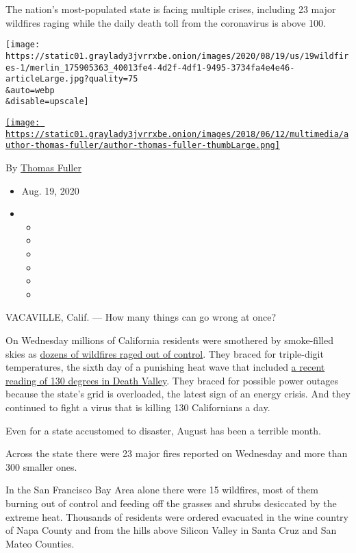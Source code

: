The nation's most-populated state is facing multiple crises, including
23 major wildfires raging while the daily death toll from the
coronavirus is above 100.

\texttt{[image: https://static01.graylady3jvrrxbe.onion/images/2020/08/19/us/19wildfires-1/merlin\_175905363\_40013fe4-4d2f-4df1-9495-3734fa4e4e46-articleLarge.jpg?quality=75\\\&auto=webp\\\&disable=upscale]}

\href{https://www.nytimes3xbfgragh.onion/by/thomas-fuller}{\texttt{[image: https://static01.graylady3jvrrxbe.onion/images/2018/06/12/multimedia/author-thomas-fuller/author-thomas-fuller-thumbLarge.png]}}

By \href{https://www.nytimes3xbfgragh.onion/by/thomas-fuller}{Thomas
Fuller}

\begin{itemize}
\item
  Aug. 19, 2020
\item
  \begin{itemize}
  \item
  \item
  \item
  \item
  \item
  \item
  \end{itemize}
\end{itemize}

VACAVILLE, Calif. --- How many things can go wrong at once?

On Wednesday millions of California residents were smothered by
smoke-filled skies as
\href{https://www.nytimes3xbfgragh.onion/2020/08/20/us/northern-california-wildfires.html}{dozens
of wildfires raged out of control}. They braced for triple-digit
temperatures, the sixth day of a punishing heat wave that included
\href{https://www.nytimes3xbfgragh.onion/2020/08/17/climate/death-valley-hottest-temperature-on-earth.html}{a
recent reading of 130 degrees in Death Valley}. They braced for possible
power outages because the state's grid is overloaded, the latest sign of
an energy crisis. And they continued to fight a virus that is killing
130 Californians a day.

Even for a state accustomed to disaster, August has been a terrible
month.

Across the state there were 23 major fires reported on Wednesday and
more than 300 smaller ones.

In the San Francisco Bay Area alone there were 15 wildfires, most of
them burning out of control and feeding off the grasses and shrubs
desiccated by the extreme heat. Thousands of residents were ordered
evacuated in the wine country of Napa County and from the hills above
Silicon Valley in Santa Cruz and San Mateo Counties.

